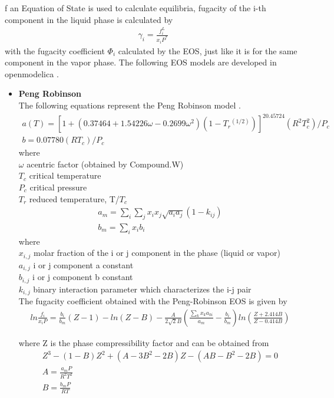 \documentclass[12pt]{report}
\begin{document}
f an Equation of State is used to calculate equilibria, fugacity of the i-th component in the liquid phase is calculated by
\begin{align*}
\gamma_i = \frac{f_i^L}{x_iP^*}
\end{align*}
with the fugacity coefficient $\Phi_i$ calculated by the EOS, just like it is for the same component in the vapor phase.
The following EOS models are developed in openmodelica \cite{DWSIM}.
\begin{itemize}
\item{\textbf{Peng Robinson}} \\
The following equations represent the Peng Robinson model \cite{PR}.
\begin{gather*}
a(T) = [1+(0.37464 + 1.54226\omega - 0.2699\omega^2)(1-T{_r}^{(1/2)})] ^20.45724(R^2T_c^2)/P_c \\
b = 0.07780(RT_c)/P_c
\end{gather*}
where \\
$\omega$  acentric factor (obtained by Compound.W) \\
$T_c$ critical temperature \\
$P_c$ critical pressure \\
$T_r$ reduced temperature, T/$T_c$ \\
\begin{gather*}
a_m = \sum_i\sum_jx_ix_j\sqrt{a_ia_j}(1-k_{ij}) \\
b_m = \sum_ix_ib_i
\end{gather*}
where \\
$x_{i,j}$ molar fraction of the i or j component in the phase (liquid or vapor) \\
$a_{i,j}$ i or j component a constant \\
$b_{i,j}$ i or j component b constant \\
$k_{i,j}$ binary interaction parameter which characterizes the i-j pair \\

The fugacity coefficient obtained with the Peng-Robinson EOS \cite{DWSIM} is given by
\begin{gather*}
ln\frac{f_i}{x_iP} = \frac{b_i}{b_m}(Z-1) - ln(Z-B) - \frac{A}{2\sqrt{2}B}(\frac{\sum_kx_ka_{ki}}{a_m} - \frac{b_i}{b_m})ln(\frac{Z+2.414B}{Z-0.414B})
\end{gather*}

where Z is the phase compressibility factor and can be obtained from 
\begin{gather*}
Z^3 - (1-B)Z^2 + (A-3B^2-2B)Z - (AB-B^2-2B) = 0 \\
A = \frac{a_mP}{R^2T^2} \\
B = \frac{b_mP}{RT} \\
\end{gather*}


\end{itemize}
\end{document}

